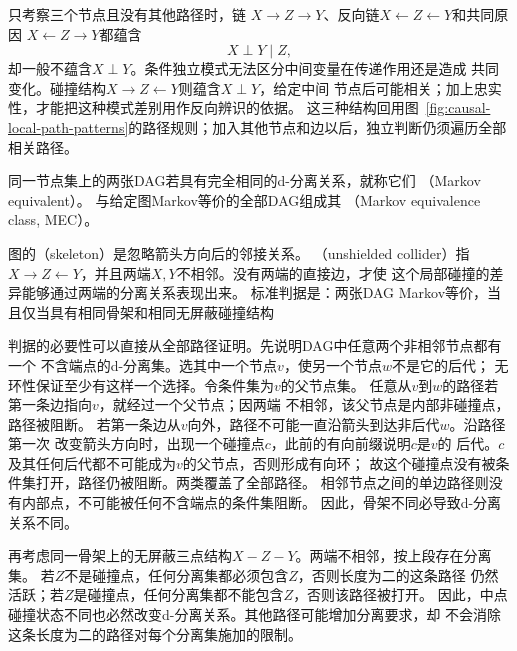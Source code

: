 只考察三个节点且没有其他路径时，链
\(X\to Z\to Y\)、反向链\(X\leftarrow Z\leftarrow Y\)和共同原因
\(X\leftarrow Z\to Y\)都蕴含
\[
  X\perp Y\mid Z,
\]
却一般不蕴含\(X\perp Y\)。条件独立模式无法区分中间变量在传递作用还是造成
共同变化。碰撞结构\(X\to Z\leftarrow Y\)则蕴含\(X\perp Y\)，给定中间
节点后可能相关；加上忠实性，才能把这种模式差别用作反向辨识的依据。
这三种结构回用图~\ref{fig:causal-local-path-patterns}的路径规则；加入其他节点和边以后，独立判断仍须遍历全部相关路径。

\begin{definition}[Markov等价与等价类]
  \label{def:causal-markov-equivalence}
  同一节点集上的两张DAG若具有完全相同的d-分离关系，就称它们
  （Markov equivalent）。
  与给定图Markov等价的全部DAG组成其
  （Markov equivalence class, MEC）。
\end{definition}

图的（skeleton）是忽略箭头方向后的邻接关系。
（unshielded collider）指
\(X\to Z\leftarrow Y\)，并且两端\(X,Y\)不相邻。没有两端的直接边，才使
这个局部碰撞的差异能够通过两端的分离关系表现出来。
标准判据是：两张DAG Markov等价，当且仅当具有相同骨架和相同无屏蔽碰撞结构

判据的必要性可以直接从全部路径证明。先说明DAG中任意两个非相邻节点都有一个
不含端点的d-分离集。选其中一个节点\(v\)，使另一个节点\(w\)不是它的后代；
无环性保证至少有这样一个选择。令条件集为\(v\)的父节点集。
任意从\(v\)到\(w\)的路径若第一条边指向\(v\)，就经过一个父节点；因两端
不相邻，该父节点是内部非碰撞点，路径被阻断。
若第一条边从\(v\)向外，路径不可能一直沿箭头到达非后代\(w\)。沿路径第一次
改变箭头方向时，出现一个碰撞点\(c\)，此前的有向前缀说明\(c\)是\(v\)的
后代。\(c\)及其任何后代都不可能成为\(v\)的父节点，否则形成有向环；
故这个碰撞点没有被条件集打开，路径仍被阻断。两类覆盖了全部路径。
相邻节点之间的单边路径则没有内部点，不可能被任何不含端点的条件集阻断。
因此，骨架不同必导致d-分离关系不同。

再考虑同一骨架上的无屏蔽三点结构\(X-Z-Y\)。两端不相邻，按上段存在分离集。
若\(Z\)不是碰撞点，任何分离集都必须包含\(Z\)，否则长度为二的这条路径
仍然活跃；若\(Z\)是碰撞点，任何分离集都不能包含\(Z\)，否则该路径被打开。
因此，中点碰撞状态不同也必然改变d-分离关系。其他路径可能增加分离要求，却
不会消除这条长度为二的路径对每个分离集施加的限制。

